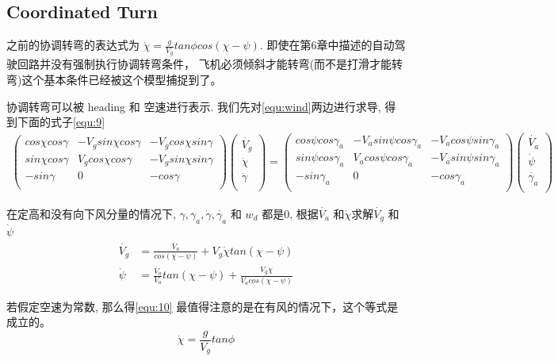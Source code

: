   \subsection{Coordinated Turn}
  之前的协调转弯的表达式为 $\dot{\chi} = \frac{g}{V_{g}} tan \phi cos(\chi - \psi)$. 
  即使在第6章中描述的自动驾驶回路并没有强制执行协调转弯条件，
  飞机必须倾斜才能转弯(而不是打滑才能转弯)这个基本条件已经被这个模型捕捉到了。\par
  协调转弯可以被 heading 和 空速进行表示. 我们先对\ref{equ:wind}两边进行求导, 得到下面的式子\ref{equ:9}
  \begin{gather} %
    \begin{pmatrix}
        cos \chi cos \gamma & - V_{g} sin \chi cos \gamma & - V_{g} cos \chi sin \gamma \\
        sin \chi cos \gamma & V_{g} cos \chi cos \gamma & - V_{g} sin \chi sin \gamma \\
        -sin \gamma & 0 & -cos \gamma \\
      \end{pmatrix} \begin{pmatrix}
        \dot{V_{g}} \\
        \dot{\chi} \\
        \dot{\gamma} \\
    \end{pmatrix}
      = \begin{pmatrix}
        cos \psi cos \gamma_{a} & - V_{a} sin \psi cos \gamma_{a} & - V_{a} cos \psi sin \gamma_{a} \\
        sin \psi cos \gamma_{a} & V_{a} cos \psi cos \gamma_{a} & - V_{a} sin \psi sin \gamma_{a} \\
        -sin \gamma_{a} & 0 & -cos \gamma_{a} \\
      \end{pmatrix} \begin{pmatrix}
        \dot{V_{a}} \\
        \dot{\psi} \\
        \dot{\gamma_{a}} \\
    \end{pmatrix}
      \label{equ:9}
  \end{gather}
  \par 在定高和没有向下风分量的情况下, $\gamma, \gamma_{a}, \dot{\gamma}, \dot{\gamma_a}$ 和 $w_{d}$ 都是0, 根据$\dot{V_{a}}$ 和$\dot{\chi}$求解$\dot{V_{g}}$ 和$\dot{\psi}$
  \begin{equation}
    \begin{split}
      \dot{V_{g}} &= \frac{\dot{V_{a}}}{cos (\chi - \psi)} + V_{g} \dot{\chi} tan(\chi - \psi) \\
      \dot{\psi} &= \frac{\dot{V_{a}}}{V_{a}} tan (\chi - \psi) + \frac{V_{g} \dot{\chi}}{V_{a}cos(\chi - \psi)}
    \end{split}
\end{equation}
\par 若假定空速为常数, 那么得\ref{equ:10} 最值得注意的是在有风的情况下，这个等式是成立的。
\begin{equation}
    \dot{\chi} = \frac{g}{V_{g}} tan \phi 
    \label{equ:10}
\end{equation}
